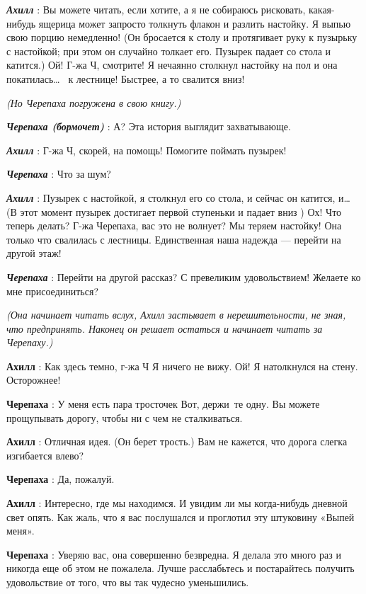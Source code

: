 \emph{\textbf{Ахилл}} : Вы можете читать, если хотите, а я не собираюсь рисковать, какая-нибудь ящерица может запросто толкнуть флакон и разлить настойку. Я выпью свою порцию немедленно! (Он бросается к столу и протягивает руку к пузырьку с настойкой; при этом он случайно толкает его. Пузырек падает со стола и катится.) Ой! Г-жа Ч, смотрите! Я нечаянно столкнул настойку на пол и она покатилась\ldots~ к лестнице! Быстрее, а то свалится вниз!

\emph{(Но Черепаха погружена в свою книгу.)}

\emph{\textbf{Черепаха (бормочет)}} : А? Эта история выглядит захватывающе.

\emph{\textbf{Ахилл}} : Г-жа Ч, скорей, на помощь! Помогите поймать пузырек!

\emph{\textbf{Черепаха}} : Что за шум?

\emph{\textbf{Ахилл}} : Пузырек с настойкой, я столкнул его со стола, и сейчас он катится, и\ldots{} (В этот момент пузырек достигает первой ступеньки и падает вниз ) Ох! Что теперь делать? Г-жа Черепаха, вас это не волнует? Мы теряем настойку! Она только что свалилась с лестницы. Единственная наша надежда --- перейти на другой этаж!

\emph{\textbf{Черепаха}} : Перейти на другой рассказ? С превеликим удовольствием! Желаете ко мне присоединиться?

\emph{(Она начинает читать вслух, Ахилл застывает в нерешительности, не зная, что предпринять. Наконец он решает остаться и начинает читать за Черепаху.)}

\textbf{Ахилл} : Как здесь темно, г-жа Ч Я ничего не вижу. Ой! Я натолкнулся на стену. Осторожнее!

\textbf{Черепаха} : У меня есть пара тросточек Вот, держи~те одну. Вы можете прощупывать дорогу, чтобы ни с чем не сталкиваться.

\textbf{Ахилл} : Отличная идея. (Он берет трость.) Вам не кажется, что дорога слегка изгибается влево?

\textbf{Черепаха} : Да, пожалуй.

\textbf{Ахилл} : Интересно, где мы находимся. И увидим ли мы когда-нибудь дневной свет опять. Как жаль, что я вас послушался и проглотил эту штуковину «Выпей меня».

\textbf{Черепаха} : Уверяю вас, она совершенно безвредна. Я делала это много раз и никогда еще об этом не пожалела. Лучше расслабьтесь и постарайтесь получить удовольствие от того, что вы так чудесно уменьшились.

